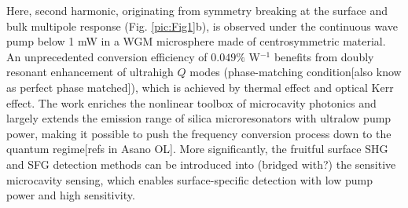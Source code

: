 \documentclass[a4paper,8pt,hyperref, twocolumn]{article}
\begin{document}
Here, second harmonic, originating from symmetry breaking at the surface and bulk multipole response (Fig. \ref{pic:Fig1}b), is observed under the continuous wave pump below 1 mW in a WGM microsphere made of centrosymmetric material. 
An unprecedented conversion efficiency of $0.049\%$ W$^{-1}$ benefits from doubly resonant enhancement of ultrahigh $Q$ modes (phase-matching condition[also know as perfect phase matched]), which is achieved by thermal effect and optical Kerr effect. 
The work enriches the nonlinear toolbox of microcavity photonics and largely extends the emission range of silica microresonators with ultralow pump power, making it possible to push the frequency conversion process down to the quantum regime[refs in Asano OL]. More significantly, the fruitful surface SHG and SFG detection methods can be introduced into (bridged with?) the sensitive microcavity sensing, which enables surface-specific detection with low pump power and high sensitivity.
\end{document}
